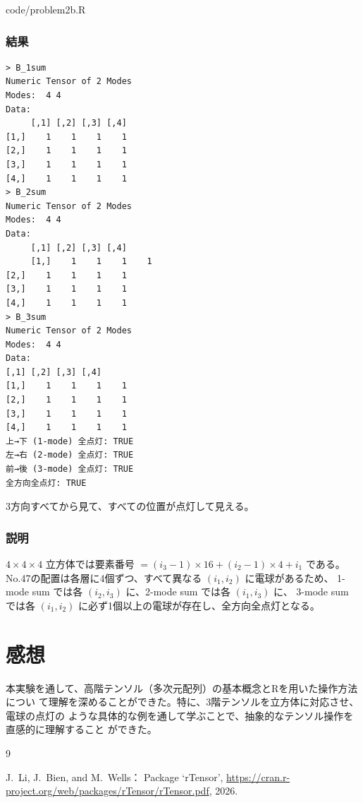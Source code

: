 \documentclass[12pt,a4paper]{ltjsarticle}
\begin{document}

{code/problem2b.R}

\subsubsection{結果}
\begin{lstlisting}     
> B_1sum
Numeric Tensor of 2 Modes
Modes:  4 4 
Data: 
     [,1] [,2] [,3] [,4]
[1,]    1    1    1    1
[2,]    1    1    1    1
[3,]    1    1    1    1
[4,]    1    1    1    1
> B_2sum
Numeric Tensor of 2 Modes
Modes:  4 4 
Data: 
     [,1] [,2] [,3] [,4]
     [1,]    1    1    1    1
[2,]    1    1    1    1
[3,]    1    1    1    1
[4,]    1    1    1    1
> B_3sum
Numeric Tensor of 2 Modes
Modes:  4 4 
Data: 
[,1] [,2] [,3] [,4]
[1,]    1    1    1    1
[2,]    1    1    1    1
[3,]    1    1    1    1
[4,]    1    1    1    1
上→下 (1-mode) 全点灯: TRUE 
左→右 (2-mode) 全点灯: TRUE 
前→後 (3-mode) 全点灯: TRUE 
全方向全点灯: TRUE
\end{lstlisting}

3方向すべてから見て、すべての位置が点灯して見える。

\subsubsection{説明}

$4\times4\times4$ 立方体では要素番号 $= (i_3-1)\times16 + (i_2-1)\times4 + i_1$
である。No.47の配置は各層に4個ずつ、すべて異なる $(i_1,i_2)$ に電球があるため、
1-mode sum では各 $(i_2,i_3)$ に、2-mode sum では各 $(i_1,i_3)$ に、
3-mode sum では各 $(i_1,i_2)$ に必ず1個以上の電球が存在し、全方向全点灯となる。

\section{感想}\label{sec:reflection}

本実験を通して、高階テンソル（多次元配列）の基本概念とRを用いた操作方法につい
て理解を深めることができた。特に、3階テンソルを立方体に対応させ、電球の点灯の
ような具体的な例を通して学ぶことで、抽象的なテンソル操作を直感的に理解すること
ができた。

\begin{thebibliography}{9}

J.~Li, J.~Bien, and M.~Wells：
Package `rTensor',
\url{https://cran.r-project.org/web/packages/rTensor/rTensor.pdf}, 2026.

\end{thebibliography}
\end{document}
